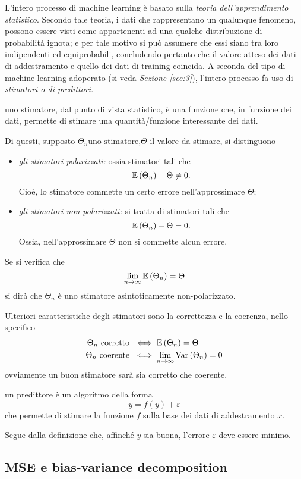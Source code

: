 \documentclass{subfiles}
\begin{document}
\label{sec:2}
L'intero processo di machine learning è basato sulla \emph{teoria dell'apprendimento statistico}.
Secondo tale teoria, i dati che rappresentano un qualunque fenomeno, possono essere visti come appartenenti ad una qualche distribuzione di probabilità ignota;
e per tale motivo si può assumere che essi siano tra loro indipendenti ed equiprobabili,
concludendo pertanto che il valore atteso dei dati di addestramento e quello dei dati di training coincida.
A seconda del tipo di machine learning adoperato (si veda \emph{Sezione \ref{sec:3}}), l'intero processo fa uso di \emph{stimatori \emph{o di} predittori}.
\begin{Definition*}
    uno stimatore, dal punto di vista statistico, è una funzione che, in funzione dei dati, permette di stimare una quantità/funzione interessante dei dati.
\end{Definition*}
Di questi, supposto $\Theta_{n} \text{uno stimatore,} \Theta$ il valore da stimare, si distinguono
\begin{itemize}
    \item \emph{gli stimatori polarizzati:} ossia stimatori tali che
          $$
              \Expected{\Theta_{n}} - \Theta \neq 0.
          $$
          Cioè, lo stimatore commette un certo errore nell'approssimare $\Theta$;

    \item \emph{gli stimatori non-polarizzati:} si tratta di stimatori tali che
          $$
              \Expected{\Theta_{n}} - \Theta = 0.
          $$
          Ossia, nell'approssimare $\Theta$ non si commette alcun errore.
\end{itemize}
\begin{Remark*}
    Se si verifica che
    $$
        \Lim{n}{\infty}{\Expected{\Theta_{n}}} = \Theta
    $$
    si dirà che $\Theta_{n}$ è uno stimatore asintoticamente non-polarizzato.
\end{Remark*}
Ulteriori caratteristiche degli stimatori sono la correttezza e la coerenza, nello specifico
$$\begin{aligned}
        \Theta_{n} \text{corretto} & \iff \Expected{\Theta_{n}} = \Theta        \\
        \Theta_{n} \text{coerente} & \iff \Lim{n}{\infty}{\Var{\Theta_{n}}} = 0
    \end{aligned}$$
ovviamente un buon stimatore sarà sia corretto che coerente.
\begin{Definition*}
    un predittore è un algoritmo della forma
    $$
        y = f(y) + \varepsilon
    $$
    che permette di stimare la funzione $f$ sulla base dei dati di addestramento $x$.
\end{Definition*}
Segue dalla definizione che, affinché $y$ sia buona, l'errore $\varepsilon$ deve essere minimo.
\clearpage

\subsection{MSE e bias-variance decomposition}

\clearpage
\end{document}
